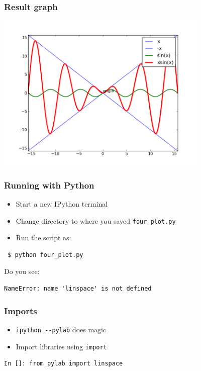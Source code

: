 \documentclass[14pt,compress]{beamer}
\newcounter{time}
\newcommand{\inctime}[1]{\addtocounter{time}{#1}{\tiny \thetime\ m}}
\newcommand{\typ}[1]{\lstinline{#1}}
\begin{document}
\begin{frame}[fragile]
  \frametitle{Result graph}
  \begin{center}
    \includegraphics[height=3in, interpolate=true]{data/four_plot}
  \end{center}
\end{frame}

\begin{frame}[fragile]
  \frametitle{Running with Python}
  \begin{itemize}
  \item Start a new IPython terminal
  \item Change directory to where you saved \typ{four_plot.py}
  \item Run the script as:
  \end{itemize}
\begin{lstlisting}
 $ python four_plot.py
\end{lstlisting}
  \pause
  Do you see:
  \begin{small}
\begin{lstlisting}
NameError: name 'linspace' is not defined
\end{lstlisting}
  \end{small}
\end{frame}

\begin{frame}[fragile]
  \frametitle{Imports}
  \begin{itemize}
  \item \typ{ipython --pylab} does magic
  \item Import libraries using \typ{import}
  \end{itemize}
\begin{lstlisting}
In []: from pylab import linspace
\end{lstlisting}
\inctime{5}
\end{frame}
\end{document}
